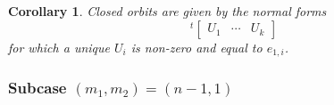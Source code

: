 \documentclass[pdftex]{sigma}
\numberwithin{equation}{section}
\newtheorem{Corollary}[Theorem]{Corollary}
\newtheorem{Lemma}[Theorem]{Lemma}
\theoremstyle{definition}
\newcommand{\R}{\mathbb{R}}
\newcommand{\D}{\mathcal{D}}
\theoremstyle{plain}
\theoremstyle{plain}
\theoremstyle{plain}
\theoremstyle{plain}
\begin{document}
\begin{Corollary}
	Closed orbits are given by the normal forms
	\begin{equation*}
		\,^t\begin{bmatrix}
		U_1 & \cdots & U_k
	\end{bmatrix}
	\end{equation*}
	for which a unique $U_i$ is non-zero and equal to $e_{1,i}$.
\end{Corollary}

\subsubsection*{Subcase $(m_1,m_2) = (n-1,1)$}

	
\end{document}
